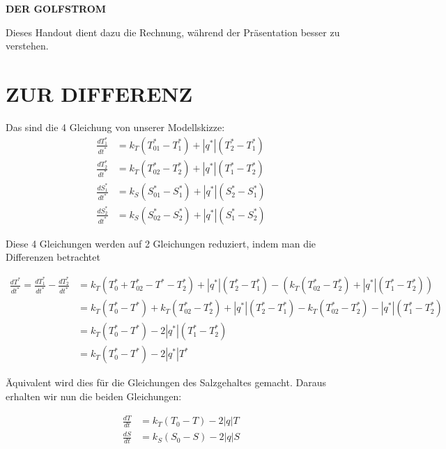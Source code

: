 \documentclass[a4paper,twoside]{article}
\begin{document}
	
	\begin{center}
	\begin{LARGE}
			\uppercase{\textbf{Der Golfstrom}} \\[12pt] 
	\end{LARGE}
	\end{center}

	
	
	Dieses Handout dient dazu die Rechnung, während der Präsentation besser zu verstehen.
	
	\section*{\uppercase{Zur Differenz}\label{sec: Differenz}}
	
	\begin{footnotesize}
	\noindent Das sind die 4 Gleichung von unserer Modellskizze:
	\begin{align*}
		\frac{dT^*_1}{dt^*} &= k_T\left(T^*_{01} - T^*_1\right) + \left|q^*\right|\left(T^*_2 - T^*_1\right) \\
		\frac{dT^*_2}{dt^*} &= k_T\left(T^*_{02} - T^*_2\right) + \left|q^*\right|\left(T^*_1 - T^*_2\right) \\
		\frac{dS^*_1}{dt^*} &= k_S\left(S^*_{01} - S^*_1\right) + \left|q^*\right|\left(S^*_2 - S^*_1\right) \\
		\frac{dS^*_2}{dt^*} &= k_S\left(S^*_{02} - S^*_2\right) + \left|q^*\right|\left(S^*_1 - S^*_2\right)
	\end{align*}
	\end{footnotesize}
	
	\noindent Diese 4 Gleichungen werden auf 2 Gleichungen reduziert, indem man die Differenzen betrachtet
	\begin{footnotesize}
	\begin{align*}
		\frac{dT^*}{dt^*} = \frac{dT^*_1}{dt^*} - \frac{dT^*_2}{dt^*} &= 
		k_T\left(T^*_{0} + T^*_{02} - T^* - T^*_2 \right) + \left|q^*\right|\left(T^*_2 - T^*_1\right)  - \left( k_T\left(T^*_{02} - T^*_2\right) + \left|q^*\right|\left(T^*_1 - T^*_2\right) \right) \\
		&= k_T\left(T^*_{0} - T^*\right) + k_T\left(T^*_{02} - T^*_2\right) + \left|q^*\right|\left(T^*_2 - T^*_1\right) - k_T\left(T^*_{02} - T^*_2\right) - \left|q^*\right|\left(T^*_1 - T^*_2\right) \\
		&= k_T\left(T^*_{0} - T^*\right) - 2\left|q^*\right|\left(T^*_1 - T^*_2\right) \\
		&= k_T\left(T^*_{0} - T^*\right) - 2\left|q^*\right|T^*
	\end{align*}
	\end{footnotesize}
	
	\noindent Äquivalent wird dies für die Gleichungen des Salzgehaltes gemacht. Daraus erhalten wir nun die beiden Gleichungen:
	\begin{footnotesize}
	\begin{align*}
		\frac{dT}{dt} &= k_T\left(T_{0} - T\right) - 2\left|q\right|T \\		
		\frac{dS}{dt} &= k_S\left(S_{0} - S\right) - 2\left|q\right|S
	\end{align*}
	\end{footnotesize}

	
	
\end{document}
